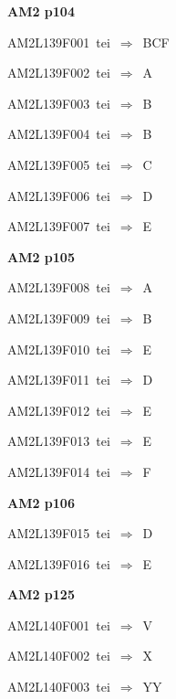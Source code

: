 \par\vfill\eject
{\bf\hfill AM2 p104\hfill\hbox{}}\par\bigskip
{\sixrm AM2L139F001\ {\sixit tei}\ }$\Rightarrow$\ BCF\par\smallskip
{\sixrm AM2L139F002\ {\sixit tei}\ }$\Rightarrow$\ A\par\smallskip
{\sixrm AM2L139F003\ {\sixit tei}\ }$\Rightarrow$\ B\par\smallskip
{\sixrm AM2L139F004\ {\sixit tei}\ }$\Rightarrow$\ B\par\smallskip
{\sixrm AM2L139F005\ {\sixit tei}\ }$\Rightarrow$\ C\par\smallskip
{\sixrm AM2L139F006\ {\sixit tei}\ }$\Rightarrow$\ D\par\smallskip
{\sixrm AM2L139F007\ {\sixit tei}\ }$\Rightarrow$\ E\par\smallskip

\par\vfill\eject
{\bf\hfill AM2 p105\hfill\hbox{}}\par\bigskip
{\sixrm AM2L139F008\ {\sixit tei}\ }$\Rightarrow$\ A\par\smallskip
{\sixrm AM2L139F009\ {\sixit tei}\ }$\Rightarrow$\ B\par\smallskip
{\sixrm AM2L139F010\ {\sixit tei}\ }$\Rightarrow$\ E\par\smallskip
{\sixrm AM2L139F011\ {\sixit tei}\ }$\Rightarrow$\ D\par\smallskip
{\sixrm AM2L139F012\ {\sixit tei}\ }$\Rightarrow$\ E\par\smallskip
{\sixrm AM2L139F013\ {\sixit tei}\ }$\Rightarrow$\ E\par\smallskip
{\sixrm AM2L139F014\ {\sixit tei}\ }$\Rightarrow$\ F\par\smallskip

\par\vfill\eject
{\bf\hfill AM2 p106\hfill\hbox{}}\par\bigskip
{\sixrm AM2L139F015\ {\sixit tei}\ }$\Rightarrow$\ D\par\smallskip
{\sixrm AM2L139F016\ {\sixit tei}\ }$\Rightarrow$\ E\par\smallskip

\par\vfill\eject
{\bf\hfill AM2 p125\hfill\hbox{}}\par\bigskip
{\sixrm AM2L140F001\ {\sixit tei}\ }$\Rightarrow$\ {\tenit V}\par\smallskip
{\sixrm AM2L140F002\ {\sixit tei}\ }$\Rightarrow$\ {\tenit X}\par\smallskip
{\sixrm AM2L140F003\ {\sixit tei}\ }$\Rightarrow$\ YY\par\smallskip

